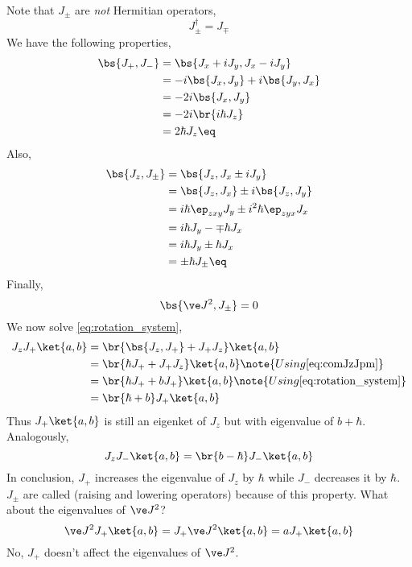 \documentclass{article}
\begin{document}
Note that $J_{\pm}$ are \textit{not} Hermitian operators,
\[ J_{\pm}^{\dagger} = J_{\mp} \]
We have the following properties,
\begin{align*}
    \bs{J_+, J_-}
    &= \bs{J_x + i J_y, J_x - i J_y} \\
    &= -i\bs{J_x, J_y} +i\bs{J_y, J_x} \\
    &= -2i\bs{J_x, J_y} \\
    &= -2i\br{i \hbar J_z} \\
    &= 2\hbar J_z \eq \label{eq:comJpJm}
\end{align*}
Also,
\begin{align*}
    \bs{J_z, J_{\pm}}
    &= \bs{J_z, J_x \pm i J_y} \\
    &= \bs{J_z, J_x} \pm i \bs{J_z, J_y} \\
    &= i \hbar \ep_{zxy} J_y \pm i^2 \hbar \ep_{zyx} J_x \\
    &= i \hbar J_y - \mp \hbar J_x \\
    &= i \hbar J_y \pm \hbar J_x \\
    &= \pm \hbar J_{\pm} \eq \label{eq:comJzJpm}
\end{align*}
Finally,
\[ \bs{\ve J^2, J_{\pm}} = 0 \]
We now solve \cref{eq:rotation_system},
\begin{align*}
    J_z J_+ \ket{a,b}
    &= \br{\bs{J_z, J_+} + J_+ J_z} \ket{a,b} \\
    &= \br{\hbar J_+ + J_+ J_z} \ket{a,b} \note{Using \cref{eq:comJzJpm}}\\
    &= \br{\hbar J_+ + b J_+} \ket{a,b} \note{Using \cref{eq:rotation_system}}\\
    &= \br{\hbar + b }J_+ \ket{a,b}
\end{align*}
Thus $J_+ \ket{a,b}$ is still an eigenket of $J_z$ but with eigenvalue of $b+\hbar$. Analogously,
\[ J_z J_- \ket{a,b} = \br{b - \hbar} J_- \ket{a,b} \]
In conclusion, $J_+$ increases the eigenvalue of $J_z$ by $\hbar$ while $J_-$ decreases it by $\hbar$. $J_{\pm}$ are called  (raising and lowering operators) because of this property. What about the eigenvalues of $\ve J^2$?
\[ \ve J^2 J_+ \ket{a,b} = J_+ \ve J^2 \ket{a,b} = a J_+\ket{a,b} \]
No, $J_+$ doesn't affect the eigenvalues of $\ve J^2$.\\
\end{document}
